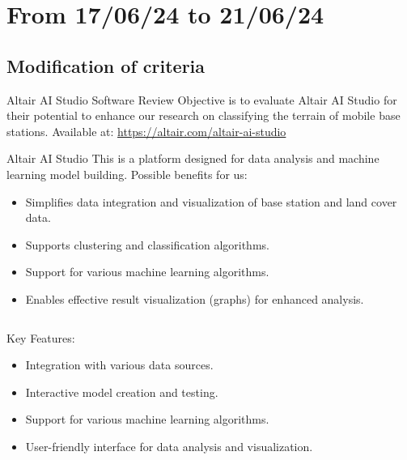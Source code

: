 \smallframetitle

\section{From 17/06/24 to 21/06/24}
\insertsectionframe

\subsection{Modification of criteria}
\insertsubsectionframe

\begin{frame}{Altair AI Studio Software Review}
    Objective is to evaluate Altair AI Studio for their potential to enhance our research on classifying the terrain of mobile base stations.
    Available at: \url{https://altair.com/altair-ai-studio}
    \begin{block}{Altair AI Studio}
        This is a platform designed for data analysis and machine learning model building. Possible benefits for us:
        \begin{itemize}
            \item Simplifies data integration and visualization of base station and land cover data.
            \item Supports clustering and classification algorithms.
            \item Support for various machine learning algorithms.
            \item Enables effective result visualization (graphs) for enhanced analysis.
        \end{itemize}
    \end{block}
    \begin{columns}
        \begin{column}{0.4\paperwidth}
            \begin{block}{Key Features:}
                \begin{itemize}
                    \item Integration with various data sources.
                    \item Interactive model creation and testing.
                    \item Support for various machine learning algorithms.
                    \item User-friendly interface for data analysis and visualization.
                \end{itemize}
            \end{block}

\end{column}
\end{columns}
\end{frame}
